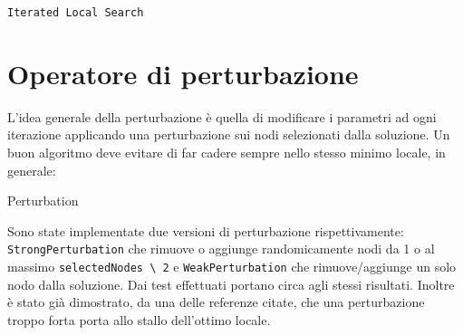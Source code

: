\documentclass[11pt]{article}
\begin{document}
\begin{algorithm}
\caption{\texttt{Iterated Local Search}}
\begin{algorithmic}


\EndWhile
{}
\end{algorithmic}
\end{algorithm}

\pagebreak

\section{Operatore di perturbazione}

L'idea generale della perturbazione è quella di modificare i parametri ad ogni iterazione applicando una perturbazione sui nodi selezionati dalla soluzione.
Un buon algoritmo deve evitare di far cadere sempre nello stesso minimo locale, in generale:

\begin{algorithm}
\caption{Perturbation}
\begin{algorithmic}
\end{algorithmic}
\end{algorithm}

Sono state implementate due versioni di perturbazione rispettivamente: \verb|StrongPerturbation| che rimuove o aggiunge
randomicamente nodi da 1 o al massimo \verb|selectedNodes \ 2| e \verb|WeakPerturbation| che rimuove/aggiunge un solo nodo dalla soluzione.
Dai test effettuati portano circa agli stessi risultati. Inoltre è stato già dimostrato, da una delle referenze citate, che una perturbazione troppo forta porta allo stallo dell'ottimo locale.
\end{document}
